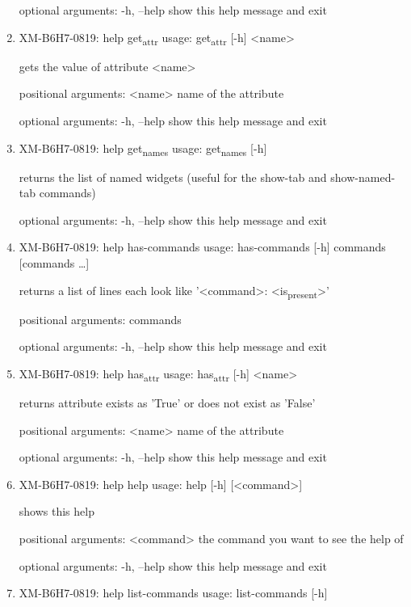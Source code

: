 \documentclass[11pt]{article}
\begin{document}
\begin{enumerate}
optional arguments:
  -h, --help  show this help message and exit

\item XM-B6H7-0819: help get\textsubscript{attr}
\label{sec:org71e2743}
usage: get\textsubscript{attr} [-h] <name>

gets the value of attribute <name>

positional arguments:
  <name>      name of the attribute

optional arguments:
  -h, --help  show this help message and exit

\item XM-B6H7-0819: help get\textsubscript{names}
\label{sec:orgd01e2ba}
usage: get\textsubscript{names} [-h]

returns the list of named widgets (useful for the show-tab and show-named-tab
commands)

optional arguments:
  -h, --help  show this help message and exit

\item XM-B6H7-0819: help has-commands
\label{sec:orge1f368d}
usage: has-commands [-h] commands [commands \ldots{}]

returns a list of lines each look like '<command>: <is\textsubscript{present}>'

positional arguments:
  commands

optional arguments:
  -h, --help  show this help message and exit

\item XM-B6H7-0819: help has\textsubscript{attr}
\label{sec:org7f96f8b}
usage: has\textsubscript{attr} [-h] <name>

returns attribute exists as 'True' or does not exist as 'False'

positional arguments:
  <name>      name of the attribute

optional arguments:
  -h, --help  show this help message and exit

\item XM-B6H7-0819: help help
\label{sec:orgadecd6d}
usage: help [-h] [<command>]

shows this help

positional arguments:
  <command>   the command you want to see the help of

optional arguments:
  -h, --help  show this help message and exit

\item XM-B6H7-0819: help list-commands
\label{sec:orgb9446f2}
usage: list-commands [-h]


\end{enumerate}
\end{document}
